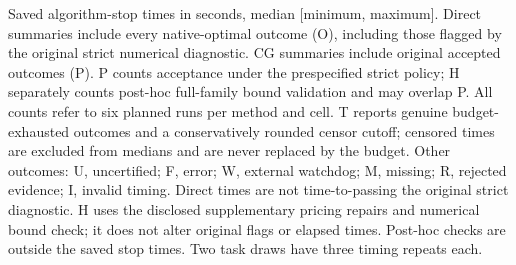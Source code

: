 \begin{table}[htbp]
\caption{Saved algorithm-stop times in seconds, median [minimum, maximum]. Direct summaries include every native-optimal outcome (O), including those flagged by the original strict numerical diagnostic. CG summaries include original accepted outcomes (P). P counts acceptance under the prespecified strict policy; H separately counts post-hoc full-family bound validation and may overlap P. All counts refer to six planned runs per method and cell. T reports genuine budget-exhausted outcomes and a conservatively rounded censor cutoff; censored times are excluded from medians and are never replaced by the budget. Other outcomes: U, uncertified; F, error; W, external watchdog; M, missing; R, rejected evidence; I, invalid timing. Direct times are not time-to-passing the original strict diagnostic. H uses the disclosed supplementary pricing repairs and numerical bound check; it does not alter original flags or elapsed times. Post-hoc checks are outside the saved stop times. Two task draws have three timing repeats each.}
\label{tab:lp-scaling-native-stops}
\end{table}
